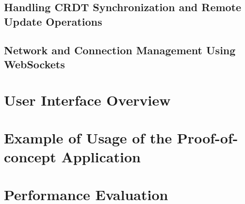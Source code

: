 \subsection{Handling CRDT Synchronization and Remote Update Operations}

\subsection{Network and Connection Management Using WebSockets}

\section{User Interface Overview}

\section{Example of Usage of the Proof-of-concept Application}

\section{Performance Evaluation}